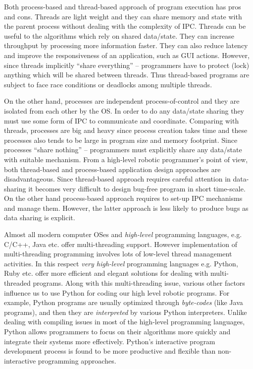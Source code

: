 Both process-based and thread-based approach of  program execution has pros and cons. Threads are light weight and they can share memory and state with the parent process without dealing with the complexity of IPC.   Threads can be useful to the algorithms which rely on shared data/state. They can increase throughput by processing more information faster. They can also reduce latency and improve the responsiveness of an application, such as GUI actions. However, since threads  implicitly ``share everything'' – programmers have to protect (lock) anything which will be
shared between threads. Thus thread-based programs are subject to face race conditions or deadlocks among multiple threads.

On the other hand, processes are independent process-of-control and they are isolated from each other by the OS. In order to do any data/state sharing they must use some form of IPC to communicate and coordinate. Comparing with threads, processes are big and heavy since process creation takes time and these processes also tends to be large in program size and memory footprint.  Since processes ``share nothing'' -- programmers must explicitly share any data/state with suitable mechanism. From a high-level robotic programmer's point of view, both thread-based and process-based application design approaches are disadvantageous. Since thread-based approach requires careful attention in data-sharing it becomes very difficult to design bug-free program in short time-scale. On the other hand process-based approach requires to set-up IPC mechanisms and manage them. However, the latter approach is less likely to produce bugs as data sharing is explicit.
 
Almost all modern computer OSes and {\em high-level} programming languages, e.g. C/C++, Java etc. offer multi-threading support. However implementation of multi-threading programming involves lots of low-level thread management activities. In this respect {\em very high-level} programming languages e.g. Python, Ruby etc. offer more efficient and elegant solutions for dealing with multi-threaded programs. Along with this multi-threading issue, various other factors influence us to use Python for coding our high level robotic programs. For example, Python programs are  usually optimized through {\em byte-codes} (like Java programs), and then they are {\em interpreted} by various Python interpreters. Unlike dealing with compiling issues in most of the high-level programming languages, Python allows programmers to focus on their  algorithms more quickly and integrate their systems more effectively. Python's interactive program development process is found to be more productive and flexible than non-interactive programming approaches.


